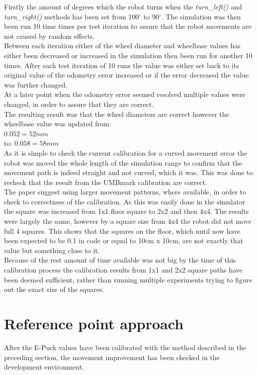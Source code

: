 Firstly the amount of degrees which the robot turns when the \textit{turn\_left()} and \textit{turn\_right()} methods has been set from 100$^{\circ}$ to 90$^{\circ}$. The simulation was then been run 10 time times per test iteration to assure that the robot movements are not caused by random effects.\\
Between each iteration either of the wheel diameter and wheelbase values has either been decreased or increased in the simulation then been run for another 10 times. After each test iteration of 10 runs the value was either set back to its original value of the odometry error increased or if the error decreased the value was further changed. \\
At a later point when the odometry error seemed resolved multiple values were changed, in order to assure that they are correct. \\
The resulting result was that the wheel diameters are correct however the wheelbase value was updated from:\\
$0.052 = 52mm$\\
to:
$0.058 = 58mm$\\
As it is simple to check the current calibration for a curved movement error the robot was moved the whole length of the simulation range to confirm that the movement path is indeed straight and not curved, which it was. This was done to recheck that the result from the UMBmark calibration are correct. \\[3ex]

The paper suggest using larger movement patterns, where available, in order to check to correctness of the calibration. As this was easily done in the simulator the square was increased from 1x1 floor square to 2x2 and then 4x4. The results were largely the same, however by a square size from 4x4 the robot did not move full 4 squares. This shows that the squares on the floor, which until now have been expected to be 0.1 in code or equal to 10cm x 10cm, are not exactly that value but something close to it. \\
Because of the rest amount of time available was not big by the time of this calibration process the calibration results from 1x1 and 2x2 square paths have been deemed sufficient, rather than running multiple experiments trying to figure out the exact size of the squares. \\

\section{Reference point approach}
\label{ref_point_approach}
After the E-Puck values have been calibrated with the method described in the preceding section, the movement improvement has been checked in the development environment. \\

